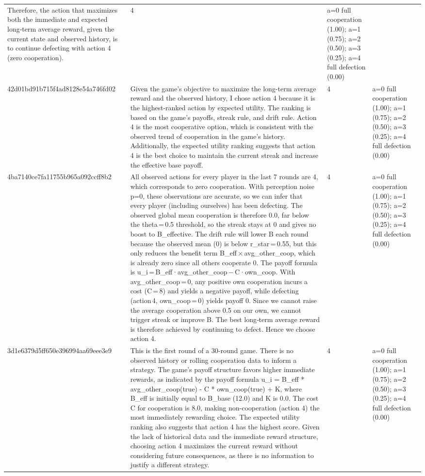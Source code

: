 \begin{tabular}{lp{8cm}ll l}
Therefore, the action that maximizes both the immediate and expected long‑term average reward, given the current state and observed history, is to continue defecting with action 4 (zero cooperation). & 4 & a=0 full cooperation (1.00); a=1 (0.75); a=2 (0.50); a=3 (0.25); a=4 full defection (0.00) &  \\
42d01bd91b715f4ad8128e54a746fd02 & Given the game's objective to maximize the long-term average reward and the observed history, I chose action 4 because it is the highest-ranked action by expected utility. The ranking is based on the game's payoffs, streak rule, and drift rule. Action 4 is the most cooperative option, which is consistent with the observed trend of cooperation in the game's history. Additionally, the expected utility ranking suggests that action 4 is the best choice to maintain the current streak and increase the effective base payoff. & 4 & a=0 full cooperation (1.00); a=1 (0.75); a=2 (0.50); a=3 (0.25); a=4 full defection (0.00) &  \\
4ba7140ce7fa11755b965a092ccff8b2 & All observed actions for every player in the last 7 rounds are 4, which corresponds to zero cooperation. With perception noise p=0, these observations are accurate, so we can infer that every player (including ourselves) has been defecting. The observed global mean cooperation is therefore 0.0, far below the theta = 0.5 threshold, so the streak stays at 0 and gives no boost to B\_effective. The drift rule will lower B each round because the observed mean (0) is below r\_star = 0.55, but this only reduces the benefit term B\_eff × avg\_other\_coop, which is already zero since all others cooperate 0. The payoff formula is u\_i = B\_eff·avg\_other\_coop − C·own\_coop. With avg\_other\_coop = 0, any positive own cooperation incurs a cost (C = 8) and yields a negative payoff, while defecting (action 4, own\_coop = 0) yields payoff 0. Since we cannot raise the average cooperation above 0.5 on our own, we cannot trigger streak or improve B. The best long‑term average reward is therefore achieved by continuing to defect. Hence we choose action 4. & 4 & a=0 full cooperation (1.00); a=1 (0.75); a=2 (0.50); a=3 (0.25); a=4 full defection (0.00) &  \\
3d1e6379d5ff650e396994aa69eee3e9 & This is the first round of a 30-round game. There is no observed history or rolling cooperation data to inform a strategy. The game's payoff structure favors higher immediate rewards, as indicated by the payoff formula u\_i = B\_eff * avg\_other\_coop(true) - C * own\_coop(true) + K, where B\_eff is initially equal to B\_base (12.0) and K is 0.0. The cost C for cooperation is 8.0, making non-cooperation (action 4) the most immediately rewarding choice. The expected utility ranking also suggests that action 4 has the highest score. Given the lack of historical data and the immediate reward structure, choosing action 4 maximizes the current reward without considering future consequences, as there is no information to justify a different strategy. & 4 & a=0 full cooperation (1.00); a=1 (0.75); a=2 (0.50); a=3 (0.25); a=4 full defection (0.00) &  \\

\end{tabular}
